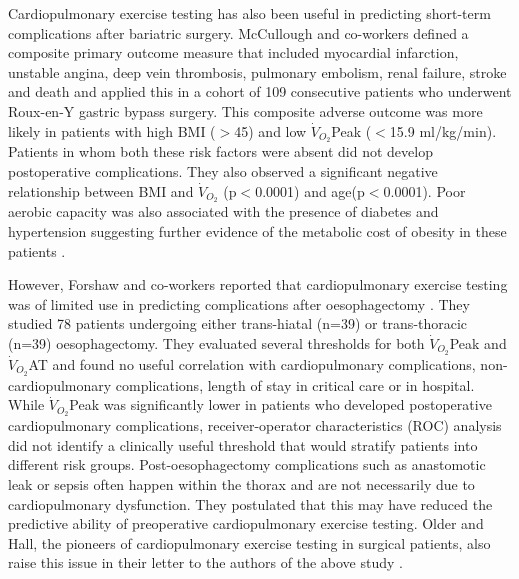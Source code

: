 Cardiopulmonary exercise testing has also been useful in predicting short-term complications after bariatric surgery. 
McCullough and co-workers defined a composite primary outcome measure that included myocardial infarction, unstable angina, deep vein thrombosis, pulmonary embolism, renal failure, stroke and death and applied this in a cohort of 109 consecutive patients who underwent Roux-en-Y gastric bypass surgery. 
This composite adverse outcome was more likely in patients with high BMI ($>$45) and low $\dot{V}_{O_2}$Peak ($<$15.9 ml/kg/min). 
Patients in whom both these risk factors were absent did not develop postoperative complications. 
They also observed a significant negative relationship between BMI and $\dot{V}_{O_2}$ (p$<$0.0001) and age(p$<$0.0001). 
Poor aerobic capacity was also associated with the presence of diabetes and hypertension suggesting further evidence of the metabolic cost of obesity in these patients \parencite{mccullough_cardiorespiratory_2006}. 

However, Forshaw and co-workers reported that cardiopulmonary exercise testing was of limited use in predicting complications after oesophagectomy \parencite{forshaw_is_2008}. 
They studied 78 patients undergoing either trans-hiatal (n=39) or trans-thoracic (n=39) oesophagectomy. 
They evaluated several thresholds for both $\dot{V}_{O_2}$Peak and $\dot{V}_{O_2}$AT and found no useful correlation with cardiopulmonary complications, non-cardiopulmonary complications, length of stay in critical care or in hospital. 
While $\dot{V}_{O_2}$Peak was significantly lower in patients who developed postoperative cardiopulmonary complications, receiver-operator characteristics (ROC) analysis did not identify a clinically useful threshold that would stratify patients into different risk groups. 
Post-oesophagectomy complications such as anastomotic leak or sepsis often happen within the thorax and are not necessarily due to cardiopulmonary dysfunction.
They postulated that this may have reduced the predictive ability of preoperative cardiopulmonary exercise testing.
Older and Hall, the pioneers of cardiopulmonary exercise testing in surgical patients, also raise this issue in their letter to the authors of the above study \parencite{hall_cardiopulmonary_2009}. 


